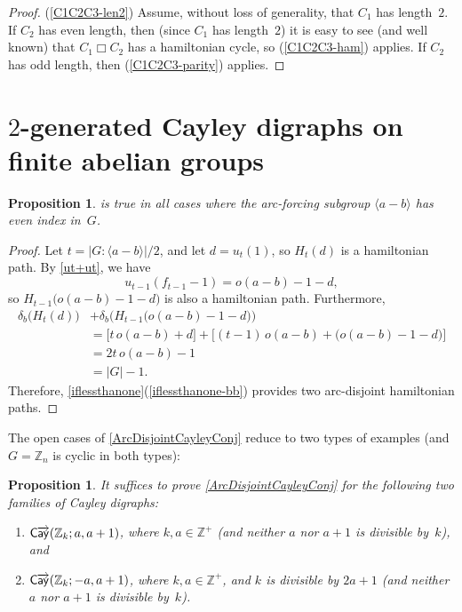 \documentclass[11pt]{amsart}
\newtheorem{prop}[equation]{Proposition}
\newcommand{\fullcref}[2]{\cref{#1}(\ref{#1-#2})}
\theoremstyle{definition}
\newcounter{case}
\numberwithin{case}{startcases}
\numberwithin{equation}{section}
\newcommand{\Z}{\mathbb{Z}}  %
\newcommand{\cartprod}{\mathbin{\Box}}
\newcommand{\cayd}{\mathop{\mathsf{C}\mkern-1mu\overrightarrow{\mathsf{ay}}}}
\begin{document}
\begin{proof}
		(\ref{C1C2C3-len2}) Assume, without loss of generality, that $C_1$ has length~$2$. If $C_2$ has even length, then (since $C_1$ has length~$2$) it is easy to see (and well known) that $C_1 \cartprod C_2$ has a hamiltonian cycle, so (\ref{C1C2C3-ham}) applies. If $C_2$ has odd length, then (\ref{C1C2C3-parity}) applies.
	\end{proof}
	
	
	
	
	
	
	\section{\texorpdfstring{$2$}{2}-generated Cayley digraphs on finite abelian groups} \label{2genFinite}
	
	\begin{prop} \label{EvenIndex}
		 is true in all cases where the arc-forcing subgroup $\langle a - b \rangle$ has even index in~$G$.
	\end{prop}
	
	\begin{proof}
		Let $t = |G : \langle a - b \rangle|/2$, and let $d = u_t(1)$, so $H_t(d)$ is a hamiltonian path. By \cref{ut+ut}, we have 
		\[u_{t-1}(f_{t-1} - 1) = o(a - b) - 1 - d ,\]
		so $H_{t-1} \bigl( o(a - b) - 1 - d \bigr)$ is also a hamiltonian path.
		Furthermore,
		\begin{align*}
			\delta_b \bigl( H_t(d) \bigr) 
			& + \delta_b \bigl( H_{t-1} \bigl( o(a - b) - 1 - d \bigr) \bigr)
			\\&= \bigl[ t \, o(a - b) + d \bigr]
			+ \bigl[ (t-1) \, o(a - b) + \bigl( o(a - b) - 1 - d \bigr) \bigr]
			\\&= 2t \, o(a - b) - 1
			\\&= |G| - 1
			.\end{align*}
		Therefore, \fullcref{iflessthanone}{bb} provides two arc-disjoint hamiltonian paths.
	\end{proof}
	
	The open cases of \cref{ArcDisjointCayleyConj} reduce to two types of examples (and $G = \Z_n$ is cyclic in both types):
	
	\begin{prop} \label{ReduceToCyclic}
		It suffices to prove \cref{ArcDisjointCayleyConj} for the following two families of Cayley digraphs:
		\begin{enumerate}
			\item \label{ReduceToCyclic-pos}
			$\cayd(\Z_k; a, a + 1)$, where $k,a \in \Z^+$ \textup(and neither $a$ nor $a + 1$ is divisible by~$k$\textup), 
			and
			\item \label{ReduceToCyclic-neg}
			$\cayd(\Z_k; -a, a + 1)$, where $k,a \in \Z^+$, and $k$ is divisible by $2a + 1$ \textup(and neither $a$ nor $a + 1$ is divisible by~$k$\textup). 
		\end{enumerate}
	\end{prop}
	
\end{document}
